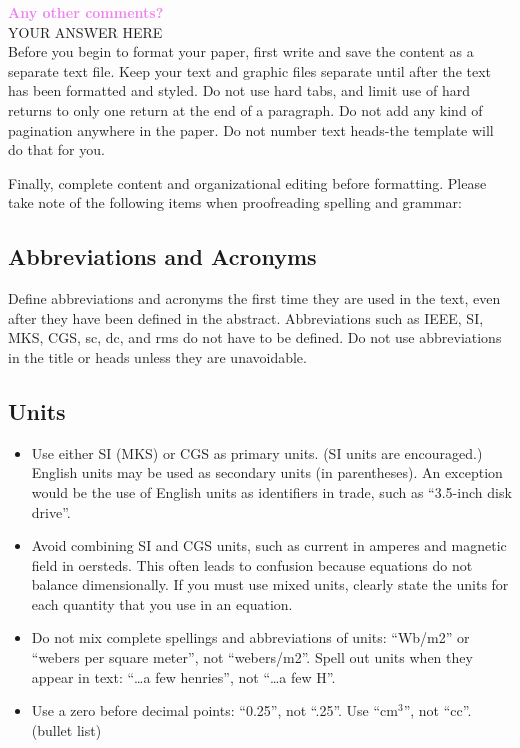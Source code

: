 \documentclass[letterpaper, 10 pt, conference]{ieeeconf}  %
\newcommand{\sectioncolor}{violet}
\begin{document}
    \textcolor{\sectioncolor}{\textbf{
    Any other comments?
    }} \\
    YOUR ANSWER HERE \\

Before you begin to format your paper, first write and save the content as a separate text file. Keep your text and graphic files separate until after the text has been formatted and styled. Do not use hard tabs, and limit use of hard returns to only one return at the end of a paragraph. Do not add any kind of pagination anywhere in the paper. Do not number text heads-the template will do that for you.

Finally, complete content and organizational editing before formatting. Please take note of the following items when proofreading spelling and grammar:

\subsection{Abbreviations and Acronyms} Define abbreviations and acronyms the first time they are used in the text, even after they have been defined in the abstract. Abbreviations such as IEEE, SI, MKS, CGS, sc, dc, and rms do not have to be defined. Do not use abbreviations in the title or heads unless they are unavoidable.

\subsection{Units}

\begin{itemize}

\item Use either SI (MKS) or CGS as primary units. (SI units are encouraged.) English units may be used as secondary units (in parentheses). An exception would be the use of English units as identifiers in trade, such as ``3.5-inch disk drive''.
\item Avoid combining SI and CGS units, such as current in amperes and magnetic field in oersteds. This often leads to confusion because equations do not balance dimensionally. If you must use mixed units, clearly state the units for each quantity that you use in an equation.
\item Do not mix complete spellings and abbreviations of units: ``Wb/m2'' or ``webers per square meter'', not ``webers/m2''.  Spell out units when they appear in text: ``\ldots a few henries'', not ``\ldots a few H''.
\item Use a zero before decimal points: ``0.25'', not ``.25''. Use ``cm$^3$'', not ``cc''. (bullet list)

\end{itemize}
\end{document}
